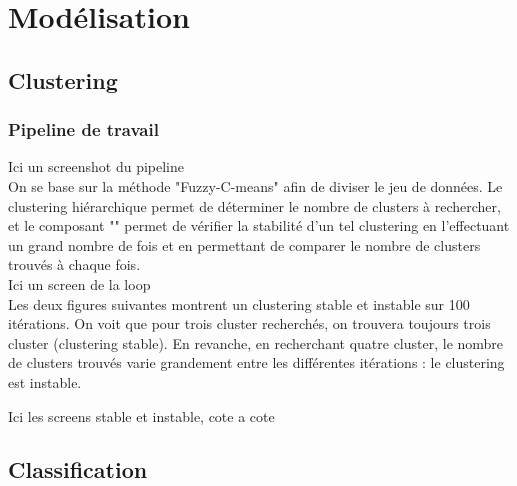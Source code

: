 \section{Modélisation}

\subsection{Clustering}

\subsubsection{Pipeline de travail}

Ici un screenshot du pipeline\\

On se base sur la méthode "Fuzzy-C-means" afin de diviser le jeu de
données. Le clustering hiérarchique permet de déterminer le nombre de
clusters à rechercher, et le composant "" permet de vérifier la stabilité
d'un tel clustering en l'effectuant un grand nombre de fois et en
permettant de comparer le nombre de clusters trouvés à chaque fois.\\

Ici un screen de la loop\\

Les deux figures suivantes montrent un clustering stable et instable sur
100 itérations. On voit que pour trois cluster recherchés, on trouvera
toujours trois cluster (clustering stable). En revanche, en recherchant
quatre cluster, le nombre de clusters trouvés varie grandement entre les
différentes itérations : le clustering est instable.

Ici les screens stable et instable, cote a cote\\

\subsection{Classification}
